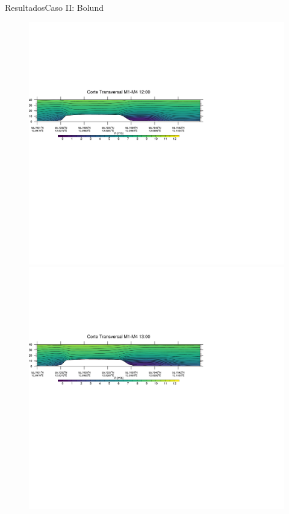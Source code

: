 \documentclass[mathserif,10pt]{beamer}
\begin{document}
\begin{frame}{Resultados}{Caso II: Bolund}
	\begin{figure}[H]
		\centering
		\includegraphics[width=0.80\linewidth,trim={0mm 202.0mm 111mm 106mm},clip]{fig/06/bol/1200rot}\\%
		\includegraphics[width=0.80\linewidth,trim={0mm 202.0mm 111mm 106mm},clip]{fig/06/bol/1300rot}\\%

\end{figure}
\end{frame}
\end{document}
